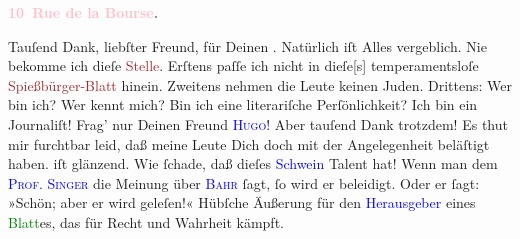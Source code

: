            \pstart
           \begin{otherlanguage}{french}\textcolor{gray}{\textbf{\textbf{\textcolor{pink}{10 Rue de la Bourse}{}\ledrightnote{\textcolor{pink}{rue de la Bourse}}.}}}\end{otherlanguage}\pend
           \pstart
           Tauſend Dank, liebſter Freund, für Deinen \label{K_L02837-1v}\label{K_L02837-1h}. Natürlich iſt Alles vergeblich. Nie bekomme ich dieſe \textcolor{brown}{Stelle}{}. Erſtens paſſe ich nicht in
                  dieſe{[}s{]} temperamentsloſe \textcolor{brown}{Spießbürger-Blatt}{} hinein. Zweitens nehmen die Leute keinen
               Juden. Drittens: Wer bin ich? Wer kennt mich? Bin ich eine literariſche
               Perſönlichkeit? Ich bin ein Journaliſt! Frag’ nur Deinen Freund \textsc{\textcolor{blue}{Hugo}{}\ledrightnote{\textcolor{blue}{Hugo von Hofmannsthal}}}!\pend
           \pstart
           Aber tauſend Dank trotzdem! Es thut mir furchtbar leid, daß meine Leute Dich doch {\pb}mit der Angelegenheit beläſtigt haben.\pend
           \pstart
           \label{K_L02837-2v}\label{K_L02837-2h} iſt glänzend. Wie ſchade, daß
               dieſes \textcolor{blue}{Schwein}{} Talent hat!
               Wenn man dem \textsc{\textcolor{blue}{Prof. Singer}{}\ledrightnote{\textcolor{blue}{Isidor Singer}}} die Meinung über \textsc{\textcolor{blue}{Bahr}{}\ledrightnote{\textcolor{blue}{Hermann Bahr}}} ſagt, ſo wird er beleidigt. Oder er ſagt: »Schön; aber er wird geleſen!«
               Hübſche Äußerung für den \textcolor{blue}{Herausgeber}{} eines \textcolor{green}{Blatt}{}es, das für Recht und Wahrheit kämpft.\pend
